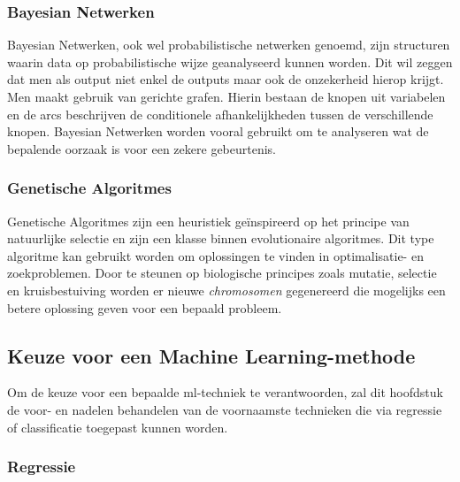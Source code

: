 	\subsubsection{Bayesian Netwerken}
	Bayesian Netwerken, ook wel probabilistische netwerken genoemd, zijn structuren waarin data op probabilistische wijze geanalyseerd kunnen worden. Dit wil zeggen dat men als output niet enkel de outputs maar ook de onzekerheid hierop krijgt. Men maakt gebruik van gerichte grafen. Hierin bestaan de knopen uit variabelen en de arcs beschrijven de conditionele afhankelijkheden tussen de verschillende knopen. Bayesian Netwerken worden vooral gebruikt om te analyseren wat de bepalende oorzaak is voor een zekere gebeurtenis. 
	
	\subsubsection{Genetische Algoritmes}
	Genetische Algoritmes zijn een heuristiek ge\"inspireerd op het principe van natuurlijke selectie en zijn een klasse binnen evolutionaire algoritmes. Dit type algoritme kan gebruikt worden om oplossingen te vinden in optimalisatie- en zoekproblemen. Door te steunen op biologische principes zoals mutatie, selectie en kruisbestuiving worden er nieuwe \textit{chromosomen} gegenereerd die mogelijks een betere oplossing geven voor een bepaald probleem.
	
\subsection{Keuze voor een Machine Learning-methode }	

Om de keuze voor een bepaalde \gls{ml}-techniek te verantwoorden, zal dit hoofdstuk de voor- en nadelen behandelen van de voornaamste technieken die via regressie of classificatie toegepast kunnen worden\cite{bron:mlalgoritmes}.

	\subsubsection{Regressie}


